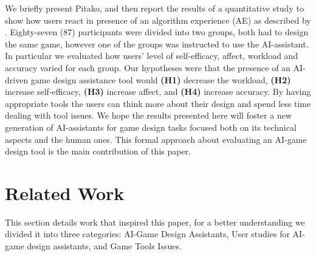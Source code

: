 \documentclass[letterpaper]{article} %
\newcommand{\dan}[1]{\textcolor{orange}{Dan: \textbf{#1}}}
\begin{document}
We briefly present Pitako, and then report the results of a quantitative study to show how users react in presence of an algorithm experience (AE) as described by \cite{Oh:2017:UVT:3025453.3025539}. Eighty-seven (87) participants were divided into two groups, both had to design the same game, however one of the groups was instructed to use the AI-assistant. In particular we evaluated how users' level of self-efficacy, affect, workload and accuracy varied for each group. Our hypotheses were that the presence of an AI-driven game design assistance tool would \textbf{(H1)} decrease the workload, \textbf{(H2)} increase self-efficacy, \textbf{(H3)} increase affect, and \textbf{(H4)} increase accuracy. By having appropriate tools the users can think more about their design and spend less time dealing with tool issues\cite{Shneiderman:2007:CST:1323688.1323689}. We hope the results presented here will foster a new generation of AI-assistants for game design tasks focused both on its technical aspects and the human ones. This formal approach about evaluating an AI-game design tool is the main contribution of this paper. %


\section{Related Work}
This section details work that inspired this paper, for a better understanding we divided it into three categories: AI-Game Design Assistants, User studies for AI-game design assistants, and Game Tools Issues.



\end{document}
